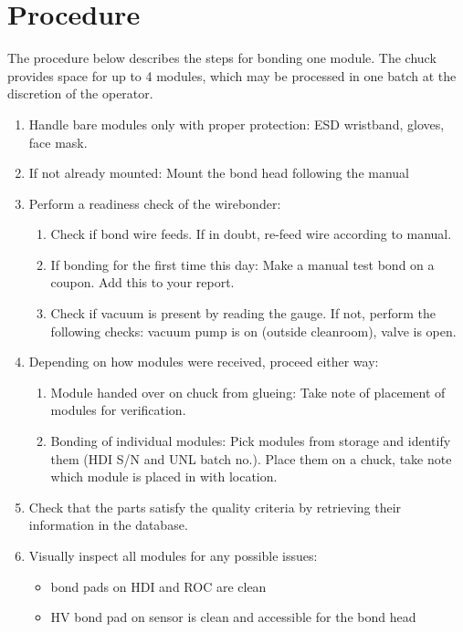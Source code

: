 \documentclass[12pt]{unlsilabsop}
\begin{document}
\section{Procedure}

The procedure below describes the steps for bonding one module. The chuck provides space for up to 4 modules, which may be processed in one batch at the discretion of the operator.
\begin{enumerate}
    \item Handle bare modules only with proper protection: ESD wristband, gloves, face mask.
    \item If not already mounted: Mount the bond head following the manual
    \item Perform a readiness check of the wirebonder:
    \begin{enumerate}
	\item Check if bond wire feeds. If in doubt, re-feed wire according to manual.
	\item If bonding for the first time this day: Make a manual test bond on a coupon. Add this to your report.
	\item Check if vacuum is present by reading the gauge. If not, perform the following checks: vacuum pump is on (outside cleanroom), valve is open.
    \end{enumerate}
    \item Depending on how modules were received, proceed either way:
    \begin{enumerate}
	\item Module handed over on chuck from glueing: Take note of placement of modules for verification.
	\item Bonding of individual modules: Pick modules from storage and identify them (HDI S/N and UNL batch no.). Place them on a chuck, take note which module is placed in with location.
    \end{enumerate}
    \item Check that the parts satisfy the quality criteria by retrieving their information in the database. 
    \item Visually inspect all modules for any possible issues:
    \begin{itemize}
	\item bond pads on HDI and ROC are clean
	\item HV bond pad on sensor is clean and accessible for the bond head
    \end{itemize}

\end{enumerate}
\end{document}
